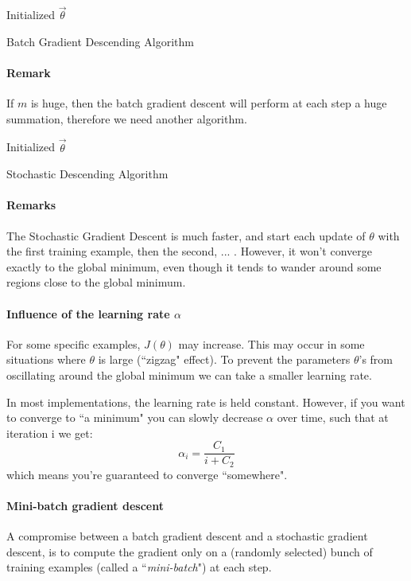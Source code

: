 \documentclass{article}
\begin{document}
\begin{algorithm}
Initialized $\vec{\theta}$\;
\caption{Batch Gradient Descending Algorithm}
\end{algorithm}




\paragraph{Remark}
If $m$ is huge, then the batch gradient descent will perform at each step a huge summation, therefore we need another algorithm.

\begin{algorithm}
Initialized $\vec{\theta}$\;
\caption{Stochastic Descending Algorithm}
\end{algorithm}

\paragraph{Remarks}
The Stochastic Gradient Descent is much faster, and start each update of $\theta$ with the first training example, then the second, ... . However, it won't converge exactly to the global minimum, even though it tends to wander around some regions close to the global minimum.

\paragraph{Influence of the learning rate $\alpha$}
For some specific examples, $J(\theta)$ may increase. This may occur in some situations where $\theta$ is large (``zigzag" effect). To prevent the parameters $\theta$'s from oscillating around the global minimum we can take a smaller learning rate.

In most implementations, the learning rate is held constant. However, if you want to converge to ``a minimum" you can slowly decrease $\alpha$ over time, such that at iteration i we get:
\[\alpha_i = \frac{C_1}{i+C_2}\]
which means you're guaranteed to converge ``somewhere".


\paragraph{Mini-batch gradient descent}
A compromise between a batch gradient descent and a stochastic gradient descent, is to compute the gradient only on a (randomly selected) bunch of training examples (called a ``\emph{mini-batch}") at each step.
\end{document}
